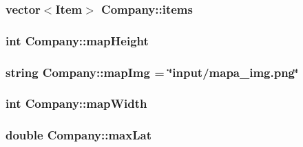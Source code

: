 \subsubsection[{items}]{\setlength{\rightskip}{0pt plus 5cm}vector$<${\bf Item}$>$ Company\+::items\hspace{0.3cm}{\ttfamily [protected]}}\label{class_company_ae8deb7528491726ce9d7f708ac4b573f}
\hypertarget{class_company_abe112eeb432d183b4a2f8df955b646b4}{}
\subsubsection[{map\+Height}]{\setlength{\rightskip}{0pt plus 5cm}int Company\+::map\+Height\hspace{0.3cm}{\ttfamily [protected]}}\label{class_company_abe112eeb432d183b4a2f8df955b646b4}
\hypertarget{class_company_a691baaaef44107ae1f3f948b2ccf9764}{}
\subsubsection[{map\+Img}]{\setlength{\rightskip}{0pt plus 5cm}string Company\+::map\+Img = \char`\"{}input/mapa\+\_\+img.\+png\char`\"{}\hspace{0.3cm}{\ttfamily [protected]}}\label{class_company_a691baaaef44107ae1f3f948b2ccf9764}
\hypertarget{class_company_a1f7f015a496bc006684f40425e960304}{}
\subsubsection[{map\+Width}]{\setlength{\rightskip}{0pt plus 5cm}int Company\+::map\+Width\hspace{0.3cm}{\ttfamily [protected]}}\label{class_company_a1f7f015a496bc006684f40425e960304}
\hypertarget{class_company_a0098ebc54b9f250351e4f9864c186f6d}{}
\subsubsection[{max\+Lat}]{\setlength{\rightskip}{0pt plus 5cm}double Company\+::max\+Lat\hspace{0.3cm}{\ttfamily [protected]}}\label{class_company_a0098ebc54b9f250351e4f9864c186f6d}
\hypertarget{class_company_a465bc910733fc1433f3190e735989a92}{}
